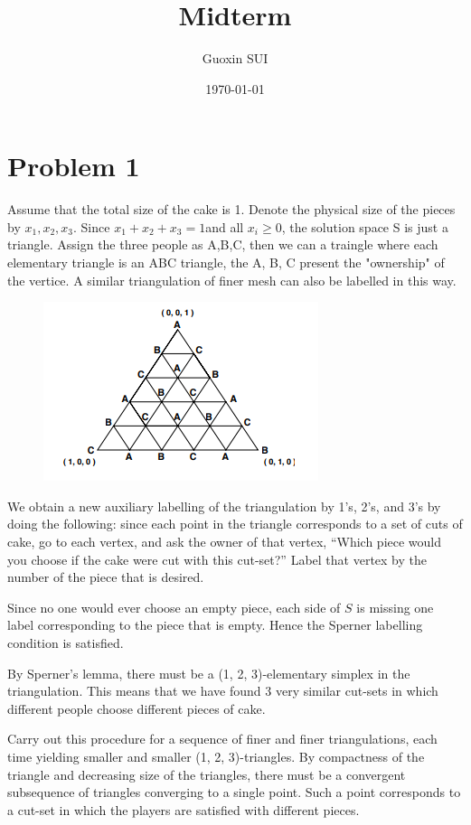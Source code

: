\documentclass{article}
\title{Midterm}
\author{Guoxin SUI}
\date{\today}
\newenvironment{answer}{\par\color{ForestGreen}}{\par}
\begin{document}
\maketitle
\section{Problem 1}
\begin{answer}
  Assume that the total size of the cake is 1. Denote the physical size of the pieces by $x_1, x_2, x_3$. Since $x_1 + x_2 + x_3 = 1 $and all $x_i \geq 0$, the solution space S is just a triangle. Assign the three people as A,B,C, then we can a traingle where each elementary triangle is an ABC triangle, the A, B, C present the "ownership" of the vertice. A similar triangulation of finer mesh can also be labelled in this way.

  \begin{figure}[h]
   \includegraphics[scale=0.6]{triangle}
\end{figure}

We obtain a new auxiliary labelling of the triangulation by 1’s, 2’s, and 3’s by
doing the following: since each point in the triangle corresponds to a set of cuts of
cake, go to each vertex, and ask the owner of that vertex, “Which piece would you
choose if the cake were cut with this cut-set?” Label that vertex by the number
of the piece that is desired.

Since no one would ever choose an empty piece, each side of $S$ is missing one label corresponding to the piece
that is empty. Hence the Sperner labelling condition is satisfied.

By Sperner’s lemma, there must be a (1, 2, 3)-elementary simplex in the triangulation.
This means that we have found 3 very similar cut-sets in which different people choose different
pieces of cake.

Carry out this procedure for a sequence of finer and finer triangulations,
each time yielding smaller and smaller (1, 2, 3)-triangles. By compactness of the
triangle and decreasing size of the triangles, there must be a convergent subsequence
of triangles converging to a single point. Such a point corresponds to a
cut-set in which the players are satisfied with different pieces.


\end{answer}
\end{document}

